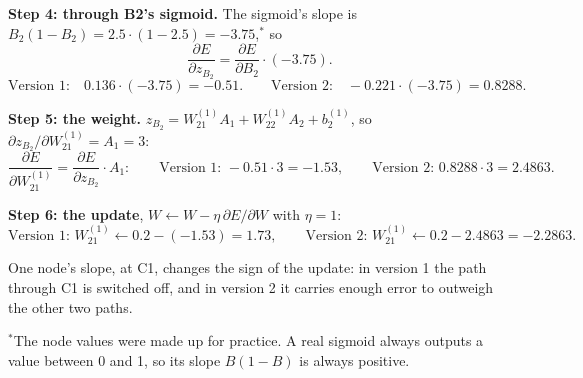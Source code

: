 \documentclass[11pt]{article}
\begin{document}
\textbf{Step 4: through B2's sigmoid.} The sigmoid's slope is $B_2(1 - B_2) = 2.5 \cdot (1 - 2.5) = -3.75$,$^{*}$ so
\[
\frac{\partial E}{\partial z_{B_2}} = \frac{\partial E}{\partial B_2} \cdot (-3.75) .
\]
\[
\text{Version 1:} \quad 0.136 \cdot (-3.75) = -0.51 . \qquad
\text{Version 2:} \quad -0.221 \cdot (-3.75) = 0.8288 .
\]

\textbf{Step 5: the weight.} $z_{B_2} = W^{(1)}_{21} A_1 + W^{(1)}_{22} A_2 + b^{(1)}_2$, so
$\partial z_{B_2} / \partial W^{(1)}_{21} = A_1 = 3$:
\[
\frac{\partial E}{\partial W^{(1)}_{21}} = \frac{\partial E}{\partial z_{B_2}} \cdot A_1:
\qquad \text{Version 1: } -0.51 \cdot 3 = -1.53, \qquad
\text{Version 2: } 0.8288 \cdot 3 = 2.4863 .
\]

\textbf{Step 6: the update}, $W \leftarrow W - \eta\, \partial E/\partial W$ with $\eta = 1$:
\[
\text{Version 1: } W^{(1)}_{21} \leftarrow 0.2 - (-1.53) = \mathbf{1.73}, \qquad
\text{Version 2: } W^{(1)}_{21} \leftarrow 0.2 - 2.4863 = \mathbf{-2.2863} .
\]

One node's slope, at C1, changes the sign of the update: in version 1 the path through C1 is switched
off, and in version 2 it carries enough error to outweigh the other two paths.


{\footnotesize $^{*}$The node values were made up for practice. A real sigmoid always outputs a value between 0
and 1, so its slope $B(1 - B)$ is always positive.}
\end{document}
